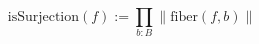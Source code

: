 \begin{equation}
  \text{isSurjection}(f) := \prod_{b : B} \parallel \text{fiber}(f, b) \parallel
\end{equation}